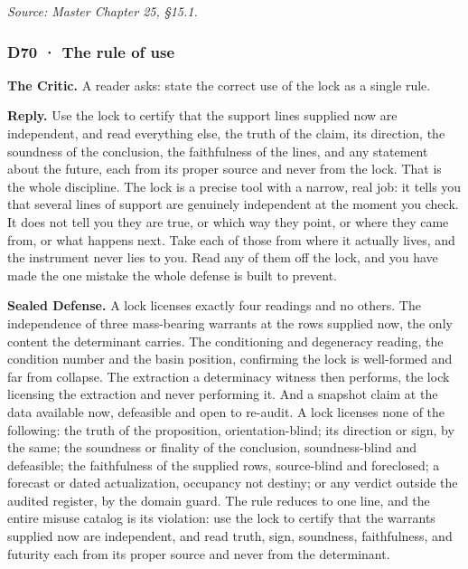 \documentclass[10pt,twocolumn]{article}
\begin{document}
\emph{Source: Master Chapter 25, §15.1.}

\hypertarget{d70-the-rule-of-use}{%
\subsubsection{D70 · The rule of use}\label{d70-the-rule-of-use}}

\textbf{The Critic.} A reader asks: state the correct use of the lock as
a single rule.

\textbf{Reply.} Use the lock to certify that the support lines supplied
now are independent, and read everything else, the truth of the claim,
its direction, the soundness of the conclusion, the faithfulness of the
lines, and any statement about the future, each from its proper source
and never from the lock. That is the whole discipline. The lock is a
precise tool with a narrow, real job: it tells you that several lines of
support are genuinely independent at the moment you check. It does not
tell you they are true, or which way they point, or where they came
from, or what happens next. Take each of those from where it actually
lives, and the instrument never lies to you. Read any of them off the
lock, and you have made the one mistake the whole defense is built to
prevent.

\textbf{Sealed Defense.} A lock licenses exactly four readings and no
others. The independence of three mass-bearing warrants at the rows
supplied now, the only content the determinant carries. The conditioning
and degeneracy reading, the condition number and the basin position,
confirming the lock is well-formed and far from collapse. The extraction
a determinacy witness then performs, the lock licensing the extraction
and never performing it. And a snapshot claim at the data available now,
defeasible and open to re-audit. A lock licenses none of the following:
the truth of the proposition, orientation-blind; its direction or sign,
by the same; the soundness or finality of the conclusion,
soundness-blind and defeasible; the faithfulness of the supplied rows,
source-blind and foreclosed; a forecast or dated actualization,
occupancy not destiny; or any verdict outside the audited register, by
the domain guard. The rule reduces to one line, and the entire misuse
catalog is its violation: use the lock to certify that the warrants
supplied now are independent, and read truth, sign, soundness,
faithfulness, and futurity each from its proper source and never from
the determinant.
\end{document}

